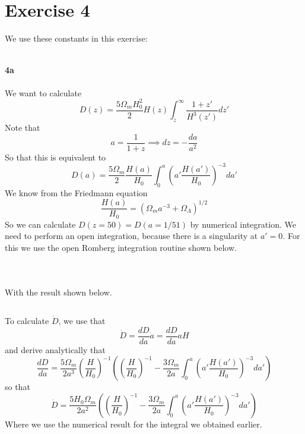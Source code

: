 \section*{Exercise 4}
We use these constants in this exercise:

\inputminted[firstline=12, lastline=24]{Python}{../ex4.py}

\paragraph{4a}
We want to calculate
\begin{equation}
    D(z) = \frac{5 \Omega_m H_0^2}{2} H(z)
    \int_z^\infty \frac{1 + z'}{H^3(z')} dz'
\end{equation}
Note that
\begin{equation*}
    a = \frac{1}{1+z} \implies dz = -\frac{da}{a^2}
\end{equation*}
So that this is equivalent to
\begin{equation}
    D(a) = \frac{5 \Omega_m }{2} \frac{H(a)}{H_0}
    \int_0^a {\left(a' \frac{H(a')}{H_0}\right)}^{-3} da'
\end{equation}
We know from the Friedmann equation
\begin{equation}
    \frac{H(a)}{H_0} = {(\Omega_m a^{-3} + \Omega_\Lambda)}^{1/2}
\end{equation}
So we can calculate $D(z=50) = D(a=1/51)$ by numerical integration.
We need to perform an open integration, because there is a singularity at $a' = 0$.
For this we use the open Romberg integration routine shown below.

\inputminted[firstline=37, lastline=57]{Python}{../integration.py}
\inputminted[firstline=68, lastline=80]{Python}{../ex4.py}
\inputminted[firstline=146, lastline=149]{Python}{../ex4.py}

With the result shown below.

\inputminted[firstline=1, lastline=1]{text}{../output/ex4.txt}

To calculate $\dot{D}$, we use that
\begin{equation*}
    \dot{D} = \frac{dD}{da} \dot{a} = \frac{dD}{da} a H
\end{equation*}
and derive analytically that
\begin{equation*}
    \frac{dD}{da} = \frac{5 \Omega_m}{2 a^3} {\left(\frac{H}{H_0}\right)}^{-1}
    \left( {\left(\frac{H}{H_0}\right)}^{-1} -
    \frac{3 \Omega_m}{2a} \int_0^a {\left(a' \frac{H(a')}{H_0}\right)}^{-3} da' \right)
\end{equation*}
so that
\begin{equation}
    \dot{D} = \frac{5 H_0 \Omega_m}{2 a^2}
    \left( {\left(\frac{H}{H_0}\right)}^{-1} -
    \frac{3 \Omega_m}{2a} \int_0^a {\left(a' \frac{H(a')}{H_0}\right)}^{-3} da' \right)
\end{equation}
Where we use the numerical result for the integral we obtained earlier.

